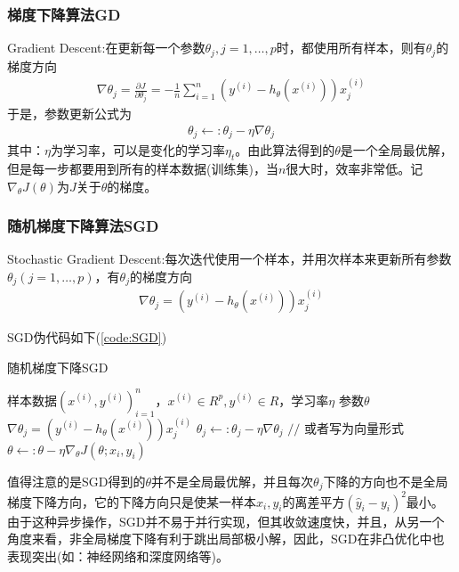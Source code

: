         \subsubsection{梯度下降算法GD}
            \par
            Gradient Descent:在更新每一个参数$\theta_j,j = 1,\dots,p$时，都使用所有样本，则有$\theta_j$的梯度方向
            \begin{align*}
            \nabla \theta_j = \frac{\partial J}{\partial \theta_j} = -\frac{1}{n}\sum_{i=1}^n\left(y^{(i)}  -  h_\theta \left( x^{(i)} \right) \right) x_j^{(i)}
            \end{align*}
            于是，参数更新公式为
            \begin{align*}
            \theta_j \leftarrow : \theta_j - \eta \nabla \theta_j
            \end{align*}
            其中：$\eta$为学习率，可以是变化的学习率$\eta_t$。由此算法得到的$\theta$是一个全局最优解，但是每一步都要用到所有的样本数据(训练集)，当$n$很大时，效率非常低。记$\nabla _\theta J(\theta)$为$J$关于$\theta$的梯度。
        \subsubsection{随机梯度下降算法SGD}
            \par
            Stochastic Gradient Descent:每次迭代使用一个样本，并用次样本来更新所有参数$\theta_j(j = 1,\dots,p)$，有$\theta_j$的梯度方向
            \begin{align*}
            \nabla \theta_j = \left(y^{(i)}  -  h_\theta \left( x^{(i)} \right) \right) x_j^{(i)}
            \end{align*}
            \par
            SGD伪代码如下(\ref{code:SGD})
            \begin{algorithm}[h]
                \caption{随机梯度下降SGD}\label{code:SGD}
                \begin{algorithmic}[1]
                    \Require 样本数据$(x^{(i)},y^{(i)})_{i=1}^n$，$x^{(i)}\in R^p,y^{(i)}\in R$，学习率$\eta$
                    \Ensure 参数$\theta$
                        \State $\nabla \theta_j = \left(y^{(i)}  -  h_\theta \left( x^{(i)} \right) \right) x_j^{(i)}$
                        \State $\theta_j \leftarrow:\theta_j - \eta \nabla\theta_j$
                      \EndFor
                      \State $//$ 或者写为向量形式
                      \State $\theta \leftarrow: \theta - \eta \nabla_\theta J(\theta;x_i,y_i)$
                    \EndFor
                \end{algorithmic}
            \end{algorithm}
            \par
            值得注意的是SGD得到的$\theta$并不是全局最优解，并且每次$\theta_j$下降的方向也不是全局梯度下降方向，它的下降方向只是使某一样本$x_i,y_i$的离差平方$(\hat{y}_i - y_i)^2$最小。由于这种异步操作，SGD并不易于并行实现，但其收敛速度快，并且，从另一个角度来看，非全局梯度下降有利于跳出局部极小解，因此，SGD在非凸优化中也表现突出(如：神经网络和深度网络等)。
